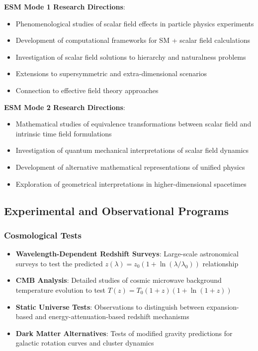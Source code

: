 \documentclass[12pt,a4paper]{article}
\begin{document}
	\textbf{ESM Mode 1 Research Directions}:
	\begin{itemize}
		\item Phenomenological studies of scalar field effects in particle physics experiments
		\item Development of computational frameworks for SM + scalar field calculations
		\item Investigation of scalar field solutions to hierarchy and naturalness problems
		\item Extensions to supersymmetric and extra-dimensional scenarios
		\item Connection to effective field theory approaches \cite{Weinberg1979}
	\end{itemize}
	
	\textbf{ESM Mode 2 Research Directions}:
	\begin{itemize}
		\item Mathematical studies of equivalence transformations between scalar field and intrinsic time field formulations
		\item Investigation of quantum mechanical interpretations of scalar field dynamics
		\item Development of alternative mathematical representations of unified physics
		\item Exploration of geometrical interpretations in higher-dimensional spacetimes
	\end{itemize}
	
	\subsection{Experimental and Observational Programs}
	\label{subsec:experimental_programs}
	
	\subsubsection{Cosmological Tests}
	\label{subsubsec:cosmological_tests}
	
	\begin{itemize}
		\item \textbf{Wavelength-Dependent Redshift Surveys}: Large-scale astronomical surveys to test the predicted $z(\lambda) = z_0(1 + \ln(\lambda/\lambda_0))$ relationship
		\item \textbf{CMB Analysis}: Detailed studies of cosmic microwave background temperature evolution to test $T(z) = T_0(1+z)(1+\ln(1+z))$
		\item \textbf{Static Universe Tests}: Observations to distinguish between expansion-based and energy-attenuation-based redshift mechanisms
		\item \textbf{Dark Matter Alternatives}: Tests of modified gravity predictions for galactic rotation curves and cluster dynamics \cite{McGaugh2016}
	\end{itemize}
	
\end{document}
